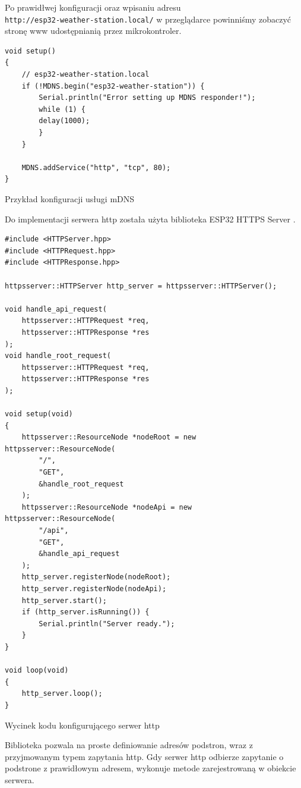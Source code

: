 \documentclass[12pt,a4paper]{article}
\begin{document}
Po prawidłwej konfiguracji oraz wpisaniu adresu \\\texttt{http://esp32-weather-station.local/} w przeglądarce powinniśmy zobaczyć stronę www udostępnianią przez
mikrokontroler.

\begin{code}[H]
\begin{verbatim}
void setup()
{
    // esp32-weather-station.local
    if (!MDNS.begin("esp32-weather-station")) {
        Serial.println("Error setting up MDNS responder!");
        while (1) {
        delay(1000);
        }
    }

    MDNS.addService("http", "tcp", 80);
}
\end{verbatim}
\caption{Przykład konfiguracji usługi mDNS}
\end{code}

Do implementacji serwera http została użyta biblioteka ESP32 HTTPS Server \cite{esp32-https-server-library}. 

\begin{code}[H]
\begin{verbatim}
#include <HTTPServer.hpp>
#include <HTTPRequest.hpp>
#include <HTTPResponse.hpp>

httpsserver::HTTPServer http_server = httpsserver::HTTPServer();

void handle_api_request(
    httpsserver::HTTPRequest *req, 
    httpsserver::HTTPResponse *res
);
void handle_root_request(
    httpsserver::HTTPRequest *req, 
    httpsserver::HTTPResponse *res
);

void setup(void)
{
    httpsserver::ResourceNode *nodeRoot = new httpsserver::ResourceNode(
        "/", 
        "GET", 
        &handle_root_request
    );
    httpsserver::ResourceNode *nodeApi = new httpsserver::ResourceNode(
        "/api", 
        "GET", 
        &handle_api_request
    );
    http_server.registerNode(nodeRoot);
    http_server.registerNode(nodeApi);
    http_server.start();
    if (http_server.isRunning()) {
        Serial.println("Server ready.");
    }
}

void loop(void)
{
    http_server.loop();
}
\end{verbatim}
\caption{Wycinek kodu konfigurującego serwer http}
\label{http-server-code-parts}
\end{code}

Biblioteka pozwala na proste definiowanie adresów podstron, wraz z przyjmowanym typem zapytania http. Gdy serwer http odbierze zapytanie o
podstrone z prawidłowym adresem, wykonuje metode zarejestrowaną w obiekcie serwera.
\end{document}
